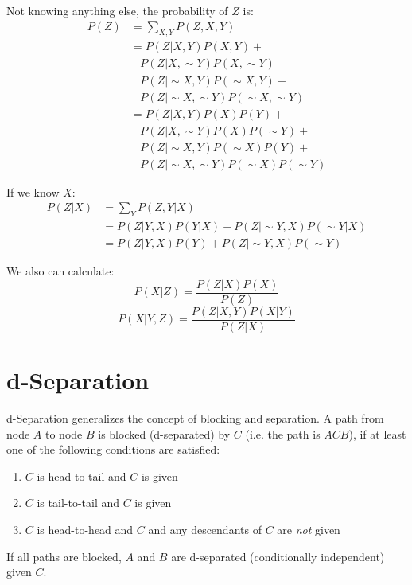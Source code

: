 \begin{multicols*}{2}
\noindent Not knowing anything else, the probability of $Z$ is:
\begin{equation*}
\begin{split}
    P(Z) &= \sum_{X,Y} P(Z,X,Y) \\
    &= P(Z|X,Y) P(X,Y) + \\
    &\ \ \ \ P(Z|X,\sim Y) P(X,\sim Y) + \\
    &\ \ \ \ P(Z|\sim X,Y) P(\sim X,Y) + \\
    &\ \ \ \ P(Z|\sim X,\sim Y) P(\sim X,\sim Y) \\
    &= P(Z|X,Y) P(X) P(Y) + \\
    &\ \ \ \ P(Z|X,\sim Y) P(X) P(\sim Y) + \\
    &\ \ \ \ P(Z|\sim X,Y) P(\sim X) P(Y) + \\
    &\ \ \ \ P(Z|\sim X,\sim Y) P(\sim X) P(\sim Y)
\end{split}
\end{equation*}
 
\noindent If we know $X$:
\begin{equation*}
\begin{split}
    P(Z|X) &= \sum_Y P(Z,Y|X)\\
    &= P(Z|Y,X) P(Y|X) + P(Z|\sim Y,X) P(\sim Y|X) \\
    &= P(Z|Y,X) P(Y) + P(Z|\sim Y,X) P(\sim Y) 
\end{split}
\end{equation*}

\noindent We also can calculate:
$$P(X|Z) = \frac{P(Z|X)P(X)}{P(Z)}$$
$$P(X|Y,Z) = \frac{P(Z|X,Y) P(X|Y)}{P(Z|X)}$$

\section{d-Separation} \label{section:dseparation}

\noindent d-Separation generalizes the concept of blocking and separation. A path from node $A$ to node $B$ is blocked (d-separated) by $C$ (i.e. the path is $ACB$), if at least one of the following conditions are satisfied:

\begin{enumerate}
    \item $C$ is head-to-tail and $C$ is given
    \item $C$ is tail-to-tail and $C$ is given
    \item $C$ is head-to-head and $C$ and any descendants of $C$ are \textit{not} given
\end{enumerate}

\noindent If all paths are blocked, $A$ and $B$ are d-separated (conditionally independent) given $C$. 

\end{multicols*}
